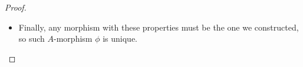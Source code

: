\documentclass[11pt,a4paper,footinclude=true,headinclude=true]{scrbook} %
\DeclareMathOperator{\Spec}{Spec}
\DeclareMathOperator{\Hom}{Hom}
\DeclareMathOperator{\Proj}{Proj}
\newcommand{\LL}{\mathscr{L}}
\newcommand{\OO}{\mathcal{O}}
\newcommand{\pp}{\mathfrak{p}}
\newcommand{\<}{\langle}
\newcommand{\>}{\rangle}
\newcommand{\isoto}{\overset{\sim}{\to}}
\newcommand{\MOD}{\mathfrak{Mod}}
\begin{document}
\begin{proof}
\begin{itemize}
        
        \item Finally, any morphism with these properties must be the one we constructed, so such $A$-morphism $\phi$ is unique. 
    \end{itemize}
\end{proof}
\end{document}
